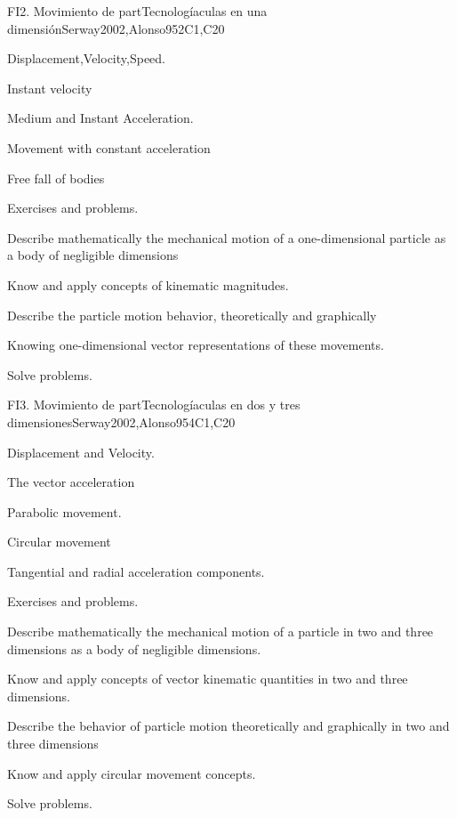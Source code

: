 \begin{syllabus}
\begin{unit}{FI2. Movimiento de partTecnologíaculas en una dimensión}{}{Serway2002,Alonso95}{2}{C1,C20}
\begin{topics}
      \item Displacement,Velocity,Speed.
      \item Instant velocity
      \item Medium and Instant Acceleration.
      \item Movement with constant acceleration
      \item Free fall of bodies
      \item Exercises and problems.
    \end{topics}
   \begin{learningoutcomes}
      \item Describe mathematically the mechanical motion of a one-dimensional particle as a body of negligible dimensions
      \item Know and apply concepts of kinematic magnitudes.
      \item Describe the particle motion behavior, theoretically and graphically
      \item Knowing one-dimensional vector representations of these movements.
      \item Solve problems.
   \end{learningoutcomes}
\end{unit}

\begin{unit}{FI3. Movimiento de partTecnologíaculas en dos y tres dimensiones}{}{Serway2002,Alonso95}{4}{C1,C20}
\begin{topics}
      \item Displacement and Velocity.
      \item The vector acceleration
      \item Parabolic movement.
      \item Circular movement
      \item Tangential and radial acceleration components.
      \item Exercises and problems.
\end{topics}

   \begin{learningoutcomes}
      \item Describe mathematically the mechanical motion of a particle in two and three dimensions as a body of negligible dimensions.
      \item Know and apply concepts of vector kinematic quantities in two and three dimensions.
      \item Describe the behavior of particle motion theoretically and graphically in two and three dimensions
      \item Know and apply circular movement concepts.
      \item Solve problems.
   \end{learningoutcomes}
\end{unit}


\end{syllabus}
